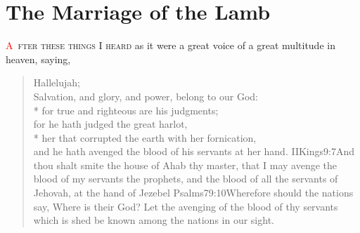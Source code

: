 
\chapter{The Marriage of the Lamb}
\lettrine[lines=3,slope=0.5em, lraise=0.3]{\textcolor{red}{A}}{\ fter these things I heard} as it were a great voice of a great multitude%
in heaven, saying,
\zz \begin{verse}
Hallelujah;\\
Salvation, and glory, and power, belong to our God:\\*\vin
{}for true and righteous are his judgments;\\
for he hath judged the great harlot,\\*\vin
her that corrupted the earth with her fornication,\\
and he hath avenged the blood of his servants at her hand.%
				{IIKings}{9:7}{And thou shalt smite the house of Ahab thy master, that I may avenge the blood of my servants the prophets, and the blood of all the servants of Jehovah, at the hand of Jezebel}%
				{Psalms}{79:10}{Wherefore should the nations say, Where is their God? Let the avenging of the blood of thy servants which is shed be known among the nations in our sight.} %
\end{verse}

